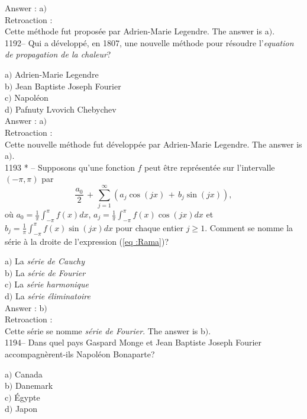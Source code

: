 ﻿\documentclass[letterpaper, 12pt]{article}
\begin{document}
Answer : a$)$\\

Retroaction : \\
Cette m\'ethode fut propos\'ee par Adrien-Marie Legendre.
The answer is a$)$.\\

1192-- Qui a d\'evelopp\'e, en 1807, une nouvelle m\'ethode pour
r\'esoudre l'{\sl equation de propagation de la chaleur}?

a$)$ Adrien-Marie Legendre \\
b$)$ Jean Baptiste Joseph Fourier \\
c$)$ Napol\'eon \\
d$)$ Pafnuty Lvovich Chebychev\\

Answer : a$)$\\

Retroaction : \\
Cette nouvelle m\'ethode fut d\'evelopp\'ee par Adrien-Marie
Legendre.
The answer is a$)$.\\

1193 * -- Supposons qu'une fonction $f$ peut \^etre repr\'esent\'ee
sur l'intervalle $(-\pi,\pi)$ par
\begin{equation}
\label{eq :Rama}
\displaystyle{\frac{a_0}2\,+\,\sum_{j=1}^{\infty}(a_j\cos(jx)\,+\,b_j\sin(jx)),}
\end{equation}
o\`u $\displaystyle{a_0=\frac1{\pi}\int_{-\pi}^{\pi}f(x)dx}$,
$\displaystyle{a_j=\frac1{\pi}\int_{-\pi}^{\pi}f(x)\cos(jx)dx}$ et
$\displaystyle{b_j=\frac1{\pi}\int_{-\pi}^{\pi}f(x)\sin(jx)dx}$ pour
chaque entier $j\ge1$. Comment se nomme la s\'erie \`a la droite de
l'expression (\ref{eq :Rama})?

a$)$ La {\sl s\'erie de Cauchy} \\
b$)$ La {\sl s\'erie de Fourier} \\
c$)$ La {\sl s\'erie harmonique} \\
d$)$ La {\sl s\'erie \'eliminatoire}\\

Answer : b$)$\\

Retroaction : \\
Cette s\'erie se nomme {\sl s\'erie de Fourier}.
The answer is b$)$.\\

1194-- Dans quel pays Gaspard Monge et Jean Baptiste Joseph Fourier
accompagn\`erent-ils Napol\'eon Bonaparte?

a$)$ Canada \\
b$)$ Danemark \\
c$)$ \'Egypte \\
d$)$ Japon\\
\end{document}
